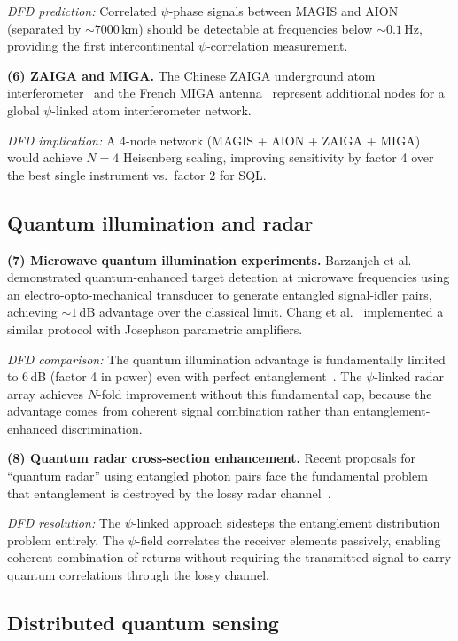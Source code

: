 \documentclass[aps,prl,twocolumn,superscriptaddress,showpacs]{revtex4-2}
\theoremstyle{definition}
\begin{document}
\textit{DFD prediction:} Correlated $\psi$-phase signals between
MAGIS and AION (separated by $\sim 7000$\,km) should be detectable
at frequencies below $\sim 0.1$\,Hz, providing the first
intercontinental $\psi$-correlation measurement.

\textbf{(6) ZAIGA and MIGA.}
The Chinese ZAIGA underground atom interferometer~\cite{Zhan2020} and
the French MIGA antenna~\cite{Canuel2018} represent additional nodes for
a global $\psi$-linked atom interferometer network.

\textit{DFD implication:} A 4-node network (MAGIS + AION + ZAIGA +
MIGA) would achieve $N = 4$ Heisenberg scaling, improving sensitivity
by factor 4 over the best single instrument vs.\ factor 2 for SQL.

\subsection{Quantum illumination and radar}

\textbf{(7) Microwave quantum illumination experiments.}
Barzanjeh et al.~\cite{Barzanjeh2020} demonstrated quantum-enhanced
target detection at microwave frequencies using an
electro-opto-mechanical transducer to generate entangled
signal-idler pairs, achieving $\sim 1$\,dB advantage over the
classical limit. Chang et al.~\cite{Chang2019} implemented a
similar protocol with Josephson parametric amplifiers.

\textit{DFD comparison:} The quantum illumination advantage
is fundamentally limited to 6\,dB (factor 4 in power) even with
perfect entanglement~\cite{Tan2008}. The $\psi$-linked radar array
achieves $N$-fold improvement without this fundamental cap, because
the advantage comes from coherent signal combination rather than
entanglement-enhanced discrimination.

\textbf{(8) Quantum radar cross-section enhancement.}
Recent proposals for ``quantum radar'' using entangled photon
pairs face the fundamental problem that entanglement is destroyed
by the lossy radar channel~\cite{Shapiro2020}.

\textit{DFD resolution:} The $\psi$-linked approach sidesteps
the entanglement distribution problem entirely. The $\psi$-field
correlates the receiver elements passively, enabling coherent
combination of returns without requiring the transmitted signal
to carry quantum correlations through the lossy channel.

\subsection{Distributed quantum sensing}
\end{document}
